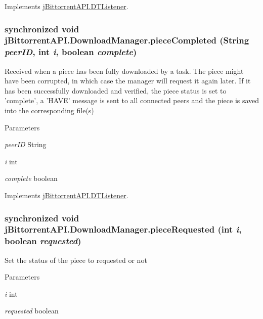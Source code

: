Implements \hyperlink{interfacej_bittorrent_a_p_i_1_1_d_t_listener}{jBittorrentAPI.DTListener}.\hypertarget{classj_bittorrent_a_p_i_1_1_download_manager_adbcd4f5283d6658ab48a9688c6dba0ca}{
\subsubsection[{pieceCompleted}]{\setlength{\rightskip}{0pt plus 5cm}synchronized void jBittorrentAPI.DownloadManager.pieceCompleted (String {\em peerID}, \/  int {\em i}, \/  boolean {\em complete})}}
\label{classj_bittorrent_a_p_i_1_1_download_manager_adbcd4f5283d6658ab48a9688c6dba0ca}
Received when a piece has been fully downloaded by a task. The piece might have been corrupted, in which case the manager will request it again later. If it has been successfully downloaded and verified, the piece status is set to 'complete', a 'HAVE' message is sent to all connected peers and the piece is saved into the corresponding file(s) 
\begin{DoxyParams}{Parameters}
\item[{\em peerID}]String \item[{\em i}]int \item[{\em complete}]boolean \end{DoxyParams}


Implements \hyperlink{interfacej_bittorrent_a_p_i_1_1_d_t_listener}{jBittorrentAPI.DTListener}.\hypertarget{classj_bittorrent_a_p_i_1_1_download_manager_aa2ca48fc9e354d7995b451703780ba7a}{
\subsubsection[{pieceRequested}]{\setlength{\rightskip}{0pt plus 5cm}synchronized void jBittorrentAPI.DownloadManager.pieceRequested (int {\em i}, \/  boolean {\em requested})}}
\label{classj_bittorrent_a_p_i_1_1_download_manager_aa2ca48fc9e354d7995b451703780ba7a}
Set the status of the piece to requested or not 
\begin{DoxyParams}{Parameters}
\item[{\em i}]int \item[{\em requested}]boolean \end{DoxyParams}


